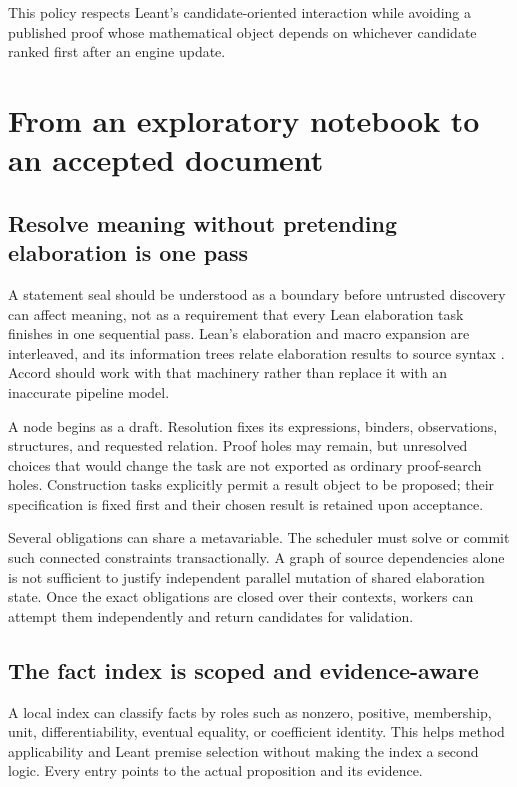 \documentclass[11pt,letterpaper]{article}
\theoremstyle{definition}
\begin{document}
This policy respects Leant's candidate-oriented interaction while avoiding a
published proof whose mathematical object depends on whichever candidate ranked
first after an engine update.

\section{From an exploratory notebook to an accepted document}\label{sec:lifecycle}
\subsection{Resolve meaning without pretending elaboration is one pass}
A statement seal should be understood as a boundary before untrusted discovery
can affect meaning, not as a requirement that every Lean elaboration task finishes
in one sequential pass. Lean's elaboration and macro expansion are interleaved,
and its information trees relate elaboration results to source syntax
\cite{leanelab}. Accord should work with that machinery rather than replace it with
an inaccurate pipeline model.

A node begins as a draft. Resolution fixes its expressions, binders, observations,
structures, and requested relation. Proof holes may remain, but unresolved choices
that would change the task are not exported as ordinary proof-search holes.
Construction tasks explicitly permit a result object to be proposed; their
specification is fixed first and their chosen result is retained upon acceptance.

Several obligations can share a metavariable. The scheduler must solve or commit
such connected constraints transactionally. A graph of source dependencies alone
is not sufficient to justify independent parallel mutation of shared elaboration
state. Once the exact obligations are closed over their contexts, workers can
attempt them independently and return candidates for validation.

\subsection{The fact index is scoped and evidence-aware}
A local index can classify facts by roles such as nonzero, positive, membership,
unit, differentiability, eventual equality, or coefficient identity. This helps
method applicability and Leant premise selection without making the index a
second logic. Every entry points to the actual proposition and its evidence.
\end{document}
